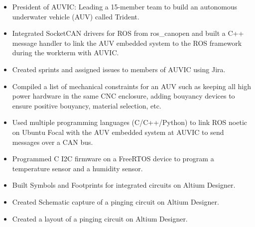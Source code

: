 \documentclass[10pt,a4paper,ragged2e,withhyper]{altacv}
\begin{document}
\begin{paracol}{2}

\begin{itemize}
\item President of AUVIC: Leading a 15-member team to build an autonomous underwater vehicle (AUV) called Trident.
\item Integrated SocketCAN drivers for ROS from ros\_canopen and built a C++ message handler to link the AUV embedded system to the ROS framework during the workterm with AUVIC.
\item Created sprints and assigned issues to members of AUVIC using Jira.
\end{itemize}





\begin{itemize}
    \item  Compiled a list of mechanical constraints for an AUV such as keeping all high power hardware in the same CNC enclosure, adding bouyancy devices to ensure positive bouyancy, material selection, etc.
    \item  Used multiple programming languages (C/C++/Python) to link ROS noetic on Ubuntu Focal with the AUV embedded system at AUVIC to send messages over a CAN bus. 
    \item  Programmed C I2C firmware on a FreeRTOS device to program a temperature sensor and a humidity sensor.
\end{itemize}

\divider

\begin{itemize}
    \item Built Symbols and Footprints for integrated circuits on Altium Designer.
    \item Created Schematic capture of a pinging circuit on Altium Designer. 
    \item Created a layout of a pinging circuit on Altium Designer.
\end{itemize}


\end{paracol}
\end{document}
